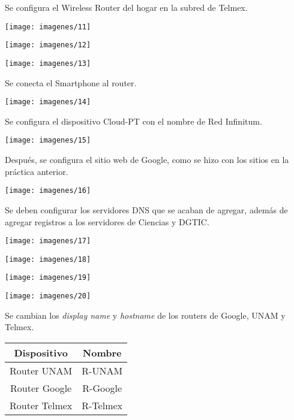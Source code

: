 \documentclass{article}
\begin{document}
Se configura el Wireless Router del hogar en la subred de Telmex.

\begin{center}
\texttt{[image: imagenes/11]}

\texttt{[image: imagenes/12]}

\texttt{[image: imagenes/13]}
\end{center}

Se conecta el Smartphone al router.

\begin{center}
\texttt{[image: imagenes/14]}
\end{center}

Se configura el dispositivo Cloud-PT con el nombre de Red Infinitum.

\begin{center}
\texttt{[image: imagenes/15]}
\end{center}

Después, se configura el sitio web de Google, como se hizo con los sitios en la práctica anterior.

\begin{center}
\texttt{[image: imagenes/16]}
\end{center}

Se deben configurar los servidores DNS que se acaban de agregar, además de agregar registros a los servidores de Ciencias y DGTIC.

\begin{center}
\texttt{[image: imagenes/17]}

\texttt{[image: imagenes/18]}

\texttt{[image: imagenes/19]}

\texttt{[image: imagenes/20]}
\end{center}

Se cambian los \textit{display name} y \textit{hostname} de los routers de Google, UNAM y Telmex.

\begin{center}
\begin{tabular}{|c|c|}
\hline
\textbf{Dispositivo} & \textbf{Nombre} \\ \hline
Router UNAM & R-UNAM \\ \hline
Router Google & R-Google \\ \hline
Router Telmex & R-Telmex \\ \hline
\end{tabular}
\end{center}
\end{document}
